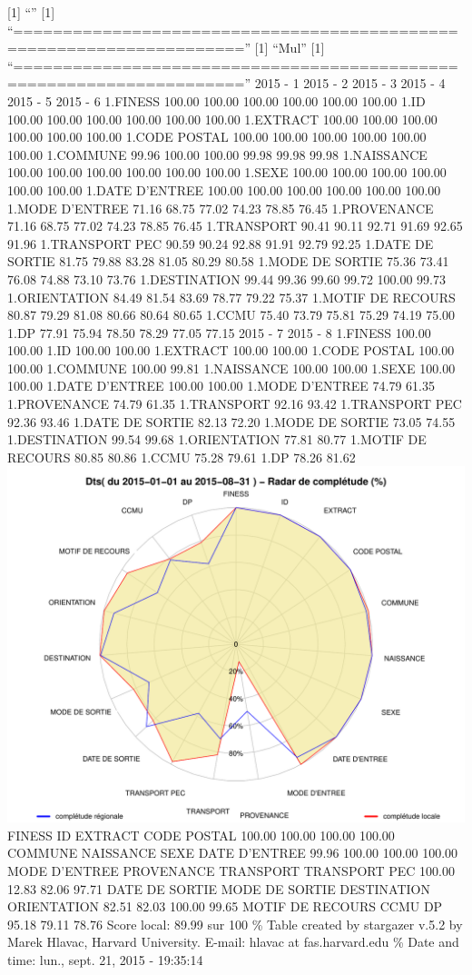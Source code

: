 \documentclass[]{article}
\begin{document}
{[}1{]} ``'' {[}1{]}
``=====================================================================''
{[}1{]} ``Mul'' {[}1{]}
``=====================================================================''
2015 - 1 2015 - 2 2015 - 3 2015 - 4 2015 - 5 2015 - 6 1.FINESS 100.00
100.00 100.00 100.00 100.00 100.00 1.ID 100.00 100.00 100.00 100.00
100.00 100.00 1.EXTRACT 100.00 100.00 100.00 100.00 100.00 100.00 1.CODE
POSTAL 100.00 100.00 100.00 100.00 100.00 100.00 1.COMMUNE 99.96 100.00
100.00 99.98 99.98 99.98 1.NAISSANCE 100.00 100.00 100.00 100.00 100.00
100.00 1.SEXE 100.00 100.00 100.00 100.00 100.00 100.00 1.DATE D'ENTREE
100.00 100.00 100.00 100.00 100.00 100.00 1.MODE D'ENTREE 71.16 68.75
77.02 74.23 78.85 76.45 1.PROVENANCE 71.16 68.75 77.02 74.23 78.85 76.45
1.TRANSPORT 90.41 90.11 92.71 91.69 92.65 91.96 1.TRANSPORT PEC 90.59
90.24 92.88 91.91 92.79 92.25 1.DATE DE SORTIE 81.75 79.88 83.28 81.05
80.29 80.58 1.MODE DE SORTIE 75.36 73.41 76.08 74.88 73.10 73.76
1.DESTINATION 99.44 99.36 99.60 99.72 100.00 99.73 1.ORIENTATION 84.49
81.54 83.69 78.77 79.22 75.37 1.MOTIF DE RECOURS 80.87 79.29 81.08 80.66
80.64 80.65 1.CCMU 75.40 73.79 75.81 75.29 74.19 75.00 1.DP 77.91 75.94
78.50 78.29 77.05 77.15 2015 - 7 2015 - 8 1.FINESS 100.00 100.00 1.ID
100.00 100.00 1.EXTRACT 100.00 100.00 1.CODE POSTAL 100.00 100.00
1.COMMUNE 100.00 99.81 1.NAISSANCE 100.00 100.00 1.SEXE 100.00 100.00
1.DATE D'ENTREE 100.00 100.00 1.MODE D'ENTREE 74.79 61.35 1.PROVENANCE
74.79 61.35 1.TRANSPORT 92.16 93.42 1.TRANSPORT PEC 92.36 93.46 1.DATE
DE SORTIE 82.13 72.20 1.MODE DE SORTIE 73.05 74.55 1.DESTINATION 99.54
99.68 1.ORIENTATION 77.81 80.77 1.MOTIF DE RECOURS 80.85 80.86 1.CCMU
75.28 79.61 1.DP 78.26 81.62
\includegraphics{completude_files/figure-latex/finess-4.pdf} FINESS ID
EXTRACT CODE POSTAL 100.00 100.00 100.00 100.00 COMMUNE NAISSANCE SEXE
DATE D'ENTREE 99.96 100.00 100.00 100.00 MODE D'ENTREE PROVENANCE
TRANSPORT TRANSPORT PEC 100.00 12.83 82.06 97.71 DATE DE SORTIE MODE DE
SORTIE DESTINATION ORIENTATION 82.51 82.03 100.00 99.65 MOTIF DE RECOURS
CCMU DP 95.18 79.11 78.76 Score local: 89.99 sur 100 \% Table created by
stargazer v.5.2 by Marek Hlavac, Harvard University. E-mail: hlavac at
fas.harvard.edu \% Date and time: lun., sept. 21, 2015 - 19:35:14
\end{document}

